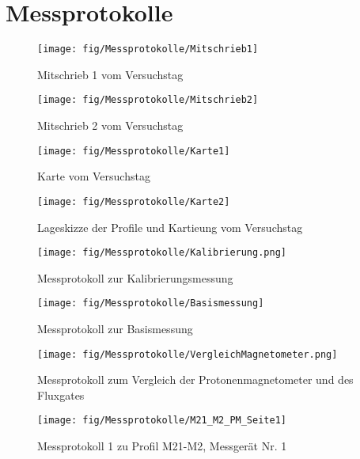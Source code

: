 \section{Messprotokolle}

\begin{figure}[!ht]
 \centering
 \texttt{[image: fig/Messprotokolle/Mitschrieb1]}
 \caption{Mitschrieb 1 vom Versuchstag}
 \label{fig:Mitschrieb_erstes}
\end{figure}

\begin{figure}[!ht]
 \centering
 \texttt{[image: fig/Messprotokolle/Mitschrieb2]}
 \caption{Mitschrieb 2 vom Versuchstag}
\end{figure}

\begin{figure}[!ht]
 \centering
 \texttt{[image: fig/Messprotokolle/Karte1]}
 \caption{Karte vom Versuchstag}
\end{figure}

\begin{figure}[!ht]
 \centering
 \texttt{[image: fig/Messprotokolle/Karte2]}
 \caption{Lageskizze der Profile und Kartieung vom Versuchstag}
 \label{fig:Mitschrieb_letztes}
\end{figure}

\begin{figure}[!ht]
 \centering
 \texttt{[image: fig/Messprotokolle/Kalibrierung.png]}
 \caption{Messprotokoll zur Kalibrierungsmessung}
 \label{fig:MPKalibrierung}
\end{figure}

\begin{figure}[!ht]
 \centering
 \texttt{[image: fig/Messprotokolle/Basismessung]}
 \caption{Messprotokoll zur Basismessung}
 \label{fig:MPBasis}
\end{figure}

\begin{figure}[!ht]
 \centering
 \texttt{[image: fig/Messprotokolle/VergleichMagnetometer.png]}
 \caption{Messprotokoll zum Vergleich der Protonenmagnetometer und des Fluxgates}
 \label{fig:MPVergleich}
\end{figure}


\begin{figure}[!ht]
 \centering
 \texttt{[image: fig/Messprotokolle/M21\_M2\_PM\_Seite1]}
 \caption{Messprotokoll 1 zu Profil M21-M2, Messgerät Nr. 1}
 \label{fig:MPProfil_erstes}
\end{figure}

